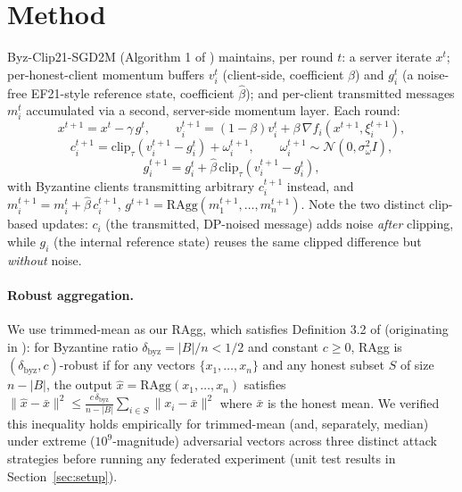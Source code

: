 \documentclass{article}
\begin{document}
\section{Method}
\label{sec:method}

Byz-Clip21-SGD2M (Algorithm 1 of \citealt{islamov2026byzclip}) maintains, per
round $t$: a server iterate $x^t$; per-honest-client momentum buffers $v_i^t$
(client-side, coefficient $\beta$) and $g_i^t$ (a noise-free EF21-style reference
state, coefficient $\hat\beta$); and per-client transmitted messages $m_i^t$
accumulated via a second, server-side momentum layer. Each round:
\[
x^{t+1} = x^t - \gamma\, g^t, \qquad
v_i^{t+1} = (1-\beta)v_i^t + \beta\,\nabla f_i(x^{t+1},\xi_i^{t+1}),
\]
\[
c_i^{t+1} = \mathrm{clip}_\tau(v_i^{t+1}-g_i^t) + \omega_i^{t+1}, \qquad
\omega_i^{t+1}\sim\mathcal N(0,\sigma_\omega^2 I),
\]
\[
g_i^{t+1} = g_i^t + \hat\beta\,\mathrm{clip}_\tau(v_i^{t+1}-g_i^t),
\]
with Byzantine clients transmitting arbitrary $c_i^{t+1}$ instead, and
$m_i^{t+1} = m_i^t + \hat\beta\, c_i^{t+1}$, $g^{t+1} = \mathrm{RAgg}(m_1^{t+1},\ldots,m_n^{t+1})$.
Note the two distinct clip-based updates: $c_i$ (the transmitted, DP-noised
message) adds noise \emph{after} clipping, while $g_i$ (the internal reference
state) reuses the same clipped difference but \emph{without} noise.

\paragraph{Robust aggregation.} We use trimmed-mean as our RAgg, which satisfies
Definition 3.2 of \citet{islamov2026byzclip} (originating in
\citealt{allouah2023fixing}): for Byzantine ratio
$\delta_{\mathrm{byz}}=|B|/n<1/2$ and constant $c\ge0$, RAgg is
$(\delta_{\mathrm{byz}},c)$-robust if for any vectors $\{x_1,\ldots,x_n\}$ and any
honest subset $S$ of size $n-|B|$, the output $\hat x=\mathrm{RAgg}(x_1,\ldots,x_n)$
satisfies $\|\hat x-\bar x\|^2 \le \frac{c\,\delta_{\mathrm{byz}}}{n-|B|}\sum_{i\in S}\|x_i-\bar x\|^2$
where $\bar x$ is the honest mean. We verified this inequality holds empirically
for trimmed-mean (and, separately, median) under extreme ($10^9$-magnitude)
adversarial vectors across three distinct attack strategies before running any
federated experiment (unit test results in Section~\ref{sec:setup}).
\end{document}
